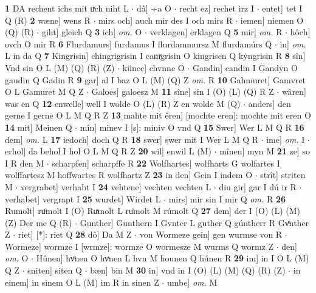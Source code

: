 \documentclass[8pt,a4paper,notitlepage]{article}
\begin{document}
\begin{table}[ht]
\begin{minipage}[t]{0.5\linewidth}
\textbf{1} DA rechent ichs mit uͯch niht L  $\cdot$ dâ] ÷a O  $\cdot$ recht ez] rechet irz I  $\cdot$ entet] tet I Q (R) \textbf{2} wæne] wens R  $\cdot$ mirs och] auch mir des I och mirs R  $\cdot$ iemen] niemen O (Q) (R)  $\cdot$ giht] gleich Q \textbf{3} ich] \textit{om.} O  $\cdot$ verklagen] erklagen Q \textbf{5} mir] \textit{om.} R  $\cdot$ hôch] ovch O mir R \textbf{6} Flurdamurs] furdamus I flurdammursz M flurdamúrs Q  $\cdot$ in] \textit{om.} L in da Q \textbf{7} Kingrisin] chingrigrisin I camͮgrisin O kingrisen Q kẏngrisin R \textbf{8} sîn] Vnd sin O L (M) (Q) (R) (Z)  $\cdot$ künec] chvnne O  $\cdot$ Gandin] candin I Gandyn O gaudin Q Gadin R \textbf{9} gar] al I baz O L (M) (Q) Z \textit{om.} R \textbf{10} Gahmuret] Gamvret O L Gamuret M Q Z  $\cdot$ Galoes] galoesz M \textbf{11} sîne] sin I (O) (L) (Q) R Z  $\cdot$ wâren] was en Q \textbf{12} enwelle] well I wolde O (L) (R) Z en wolde M (Q)  $\cdot$ anders] den gerne I gerne O L M Q R Z \textbf{13} mahte mit êren] [mochte eren]:  mochte mit eren O \textbf{14} mit] Meinen Q  $\cdot$ mîn] minev I [s]: miniv O vnd Q \textbf{15} Swer] Wer L M Q R \textbf{16} dem] \textit{om.} L \textbf{17} iedoch] doch Q R \textbf{18} swer] swer mit I Wer L M Q R  $\cdot$ ime] \textit{om.} I  $\cdot$ erhol] da behol I hol O L M Q R Z \textbf{20} wil] enwil L (M)  $\cdot$ mînen] myn M \textbf{21} ze] so I R den M  $\cdot$ scharpfen] scharpffe R \textbf{22} Wolfhartes] wolfharts G wolfartes I wolffartesz M hoffwartes R wolfhartz Z \textbf{23} in den] Gein I indem O  $\cdot$ strît] striten M  $\cdot$ vergrabet] verhabt I \textbf{24} vehtene] vechten vechten L  $\cdot$ diu gir] gar I dú ir R  $\cdot$ verhabet] vergrapt I \textbf{25} wurdet] Wirdet L  $\cdot$ mirs] mir sin I mir Q \textit{om.} R \textbf{26} Rumolt] ruͦmolt I (O) Ruͯmolt L ru͑molt M rúmolt Q \textbf{27} dem] der I (O) (L) (M) (Z) Der me Q (R)  $\cdot$ Gunther] Gunthern I Gvnter L guther Q gúntherr R Gvͤnther Z  $\cdot$ riet] [*]: riet Q \textbf{28} dô] Da M Z  $\cdot$ von Wormeze gein] gen wurmse von R  $\cdot$ Wormeze] wormze I [wrmze]: wormze O wormesze M wurms Q wormz Z  $\cdot$ den] \textit{om.} O  $\cdot$ Hûnen] hvͦnen O hvͯnen L hvn M hounen Q húnen R \textbf{29} im] in I O L (M) Q Z  $\cdot$ sniten] siten Q  $\cdot$ bæn] bin M \textbf{30} in] vnd in I (O) (L) (M) (Q) (R) (Z)  $\cdot$ in einem] in sinem O L (M) im R in sinen Z  $\cdot$ umbe] \textit{om.} M \newline
\end{minipage}
\hspace{0.5cm}
\begin{minipage}[t]{0.5\linewidth}

\end{minipage}
\end{table}
\end{document}
